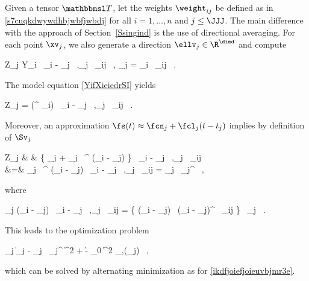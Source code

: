 Given a tensor \( \TEDR \), let the weights \( \weight_{ij} \) be defined as in \eqref{s7cuqkdwywdhbjwbfjwbdj}
for all \( i=1,\ldots,n \) and \( j \leq \JJJ \).
The main difference with the approach of Section~\ref{Ssingind} is the use of directional averaging. 
For each point \( \xv_{j} \), we also generate a direction \( \ellv_{j} \in \R^{\dimd} \) and compute
\begin{EQA}[c]
	Z_{j}
	\eqdef
	\sumi Y_{i} \, \langle \Xv_{i} - \Sv_{j} \, ,\uv_{j} \rangle \, \weight_{ij}
	\, ,
	\qquad
	\Sv_{j}
	=
	\sumi \Xv_{i} \, \weight_{ij}
	\, .
\label{juu8hjfioee433erhAVE}
\end{EQA}
The model equation \eqref{YifXieiedrSI} yields
\begin{EQA}[c]
	\E Z_{j}
	=
	\sumi \fs(\betav^{\T} \Xv_{i}) \, \langle \Xv_{i} - \Sv_{j} \, ,\uv_{j} \rangle \, \weight_{ij}
	\, .
\end{EQA}
Moreover, an approximation \( \fs(t) \approx \fcn_{j} + \fcl_{j} (t - t_{j}) \) implies by definition of \( \Sv_{j} \)
\begin{EQA}[rcl]
	\E Z_{j}
	& \approx &
	\sumi \bigl\{ \fcn_{j} + \fcl_{j} \, \betav^{\T} (\Xv_{i} - \xv_{j}) \bigr\} \, \langle \Xv_{i} - \Sv_{j} \, ,\uv_{j} \rangle \, \weight_{ij}
	\\
	&=&
	\sumi \fcl_{j} \, \betav^{\T} (\Xv_{i} - \Sv_{j}) \, \langle \Xv_{i} - \Sv_{j} \, ,\uv_{j} \rangle \, \weight_{ij}
	=
	\fcl_{j} \, \Uv_{j}^{\T} \betav
	\, ,
\end{EQA}
where
\begin{EQA}[c]
	\Uv_{j}
	\eqdef
	\sumi (\Xv_{i} - \Sv_{j}) \, \langle \Xv_{i} - \Sv_{j} \, ,\uv_{j} \rangle  \, \weight_{ij}
	=
	\biggl\{ \sumi (\Xv_{i} - \Sv_{j}) \, (\Xv_{i} - \Sv_{j})^{\T} \, \weight_{ij} \biggr\} \, \uv_{j}
	\, .
	\qquad
\label{uyhvvy883hierwfewAVE}
\end{EQA}
This leads to the optimization problem
\begin{EQA}[c]
	\sum_{j} \bigl\| \Ima_{j} - \fcl_{j} \, \Uv_{j}^{\T} \betav \bigr\|^{2} + \lambda \| \betav - \betav_{0} \|^{2}
	\to
	\min_{\betav,(\fcl_{j})}
	\, ,
\label{ikdfjoiefjoieuAVE}
\end{EQA}
which can be solved by alternating minimization as for \eqref{ikdfjoiefjoieuvbjmr3e}.

